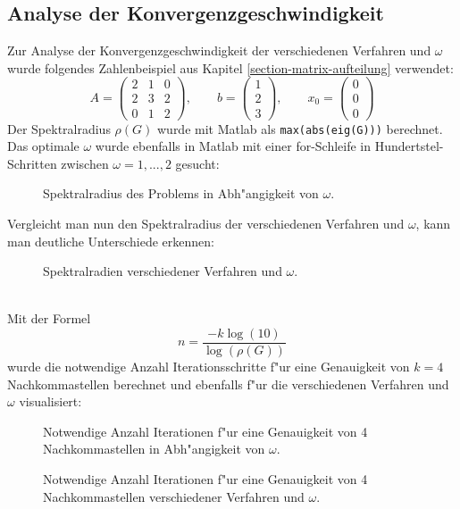 \begin{refsection}
\subsection{Analyse der Konvergenzgeschwindigkeit \label{subsec:
Konv.geschw.analyse}}
Zur Analyse der Konvergenzgeschwindigkeit der verschiedenen
Verfahren und $\omega$ wurde folgendes Zahlenbeispiel aus Kapitel
\ref{section-matrix-aufteilung} verwendet:
\begin{equation} \label{G.-S.-Ex.}
A=
\begin{pmatrix}
	2 & 1 & 0 \\
	2 & 3 & 2 \\
	0 & 1 & 2
\end{pmatrix},
			\qquad
b=
\begin{pmatrix}
	1 \\
	2 \\
	3
\end{pmatrix},
\qquad
x_0=
\begin{pmatrix}
	0 \\
	0 \\
	0
\end{pmatrix}
\end{equation}
Der Spektralradius $\rho(G)$ wurde mit Matlab als
\texttt{max(abs(eig(G)))} berechnet. Das optimale $\omega$ wurde
ebenfalls in Matlab mit einer for-Schleife in Hundertstel-Schritten
zwischen $\omega=1, ..., 2$ gesucht:
\begin{figure}[!ht]\centering
\caption{Spektralradius des Problems in Abh"angigkeit von $\omega$.}
\label{fig:Spekt.rad.vs.omega}
\end{figure}

Vergleicht man nun den Spektralradius der verschiedenen Verfahren und $\omega$, kann man deutliche Unterschiede erkennen:
\begin{figure}[!ht]\centering
\caption{Spektralradien verschiedener Verfahren und $\omega$.}
\label{fig:Spekt.rad. Diagr.}
\end{figure}\\

Mit der Formel 
\begin{equation} \label{eq: Accuracy}
n=\frac{-k \log{(10)}}{\log{(\rho(G))}}
\end{equation}
wurde die notwendige Anzahl Iterationsschritte f"ur eine Genauigkeit von
$k=4$ Nachkommastellen berechnet und ebenfalls f"ur die verschiedenen
Verfahren und $\omega$ visualisiert:
\begin{figure}[!ht]\centering
\caption{Notwendige Anzahl Iterationen f"ur  eine Genauigkeit von 4 Nachkommastellen in Abh"angigkeit von $\omega$.}
\label{fig:Spekt.rad.vs.Anz.It.}
\end{figure}
\begin{figure}[!ht]\centering
\caption{Notwendige Anzahl Iterationen f"ur  eine Genauigkeit von 4 Nachkommastellen verschiedener Verfahren und $\omega$.}
\label{fig:It.vs.omega}
\end{figure}


\end{refsection}
